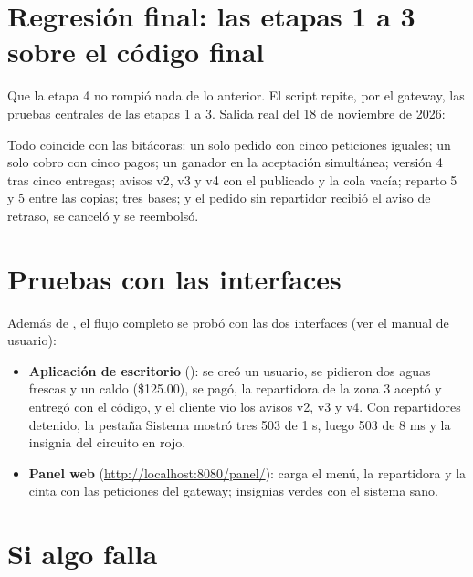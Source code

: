 \documentclass[11pt]{article}
\begin{document}
\section{Regresión final: las etapas 1 a 3 sobre el código final}

\queria Que la etapa 4 no rompió nada de lo anterior. El script 
repite, por el gateway, las pruebas centrales de las etapas 1 a 3. Salida real del 18 de noviembre de 2026:



\observado Todo coincide con las bitácoras: un solo pedido con cinco peticiones iguales; un solo cobro
con cinco pagos; un ganador en la aceptación simultánea; versión 4 tras cinco entregas; avisos v2, v3 y
v4 con el  publicado y la cola vacía; reparto 5 y 5 entre las copias; tres bases; y el pedido
sin repartidor recibió el aviso de retraso, se canceló y se reembolsó. \hfill\ok

\section{Pruebas con las interfaces}

Además de , el flujo completo se probó con las dos interfaces (ver el manual de usuario):

\begin{itemize}
  \item \textbf{Aplicación de escritorio} (): se creó un usuario, se
        pidieron dos aguas frescas y un caldo (\$125.00), se pagó, la repartidora de la zona 3 aceptó y
        entregó con el código, y el cliente vio los avisos v2, v3 y v4. Con repartidores detenido, la
        pestaña Sistema mostró tres 503 de 1 s, luego 503 de 8 ms y la insignia del circuito en rojo.
  \item \textbf{Panel web} (\url{http://localhost:8080/panel/}): carga el menú, la repartidora y la
        cinta con las peticiones del gateway; insignias verdes con el sistema sano.
\end{itemize}

\section{Si algo falla}
\end{document}
